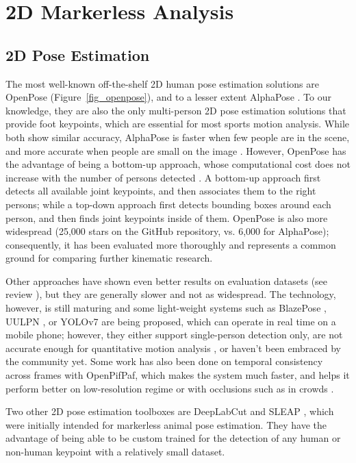 \FloatBarrier
\section{2D Markerless Analysis}
\subsection{2D Pose Estimation}

The most well-known off-the-shelf 2D human pose estimation solutions are OpenPose \cite{Cao2019} (Figure~\ref{fig_openpose}), and to a lesser extent AlphaPose \cite{Fang2017}. To our knowledge, they are also the only multi-person 2D pose estimation solutions that provide foot keypoints, which are essential for most sports motion analysis. While both show similar accuracy, AlphaPose is faster when few people are in the scene, and more accurate when people are small on the image \cite{Hidalgo2019}. However, OpenPose has the advantage of being a bottom-up approach, whose computational cost does not increase with the number of persons detected \cite{Cao2019}. A bottom-up approach first detects all available joint keypoints, and then associates them to the right persons; while a top-down approach first detects bounding boxes around each person, and then finds joint keypoints inside of them. OpenPose is also more widespread (25,000 stars on the GitHub repository, vs. 6,000 for AlphaPose); consequently, it has been evaluated more thoroughly and represents a common ground for comparing further kinematic research. 

Other approaches have shown even better results on evaluation datasets (see review \cite{Chen2020a}), but they are generally slower and not as widespread. The technology, however, is still maturing and some light-weight systems such as BlazePose \cite{Bazarevsky2020}, UULPN \cite{Wang2022a}, or YOLOv7 \cite{Wang2022b} are being proposed, which can operate in real time on a mobile phone; however, they either support single-person detection only, are not accurate enough for quantitative motion analysis \cite{Mroz2021}, or haven't been embraced by the community yet. Some work has also been done on temporal consistency across frames with OpenPifPaf, which makes the system much faster, and helps it perform better on low-resolution regime or with occlusions such as in crowds \cite{Kreiss2021}.

Two other 2D pose estimation toolboxes are DeepLabCut \cite{Mathis2018,Lauer2022} and SLEAP \cite{Pereira2022}, which were initially intended for markerless animal pose estimation. They have the advantage of being able to be custom trained for the detection of any human or non-human keypoint with a relatively small dataset. 


